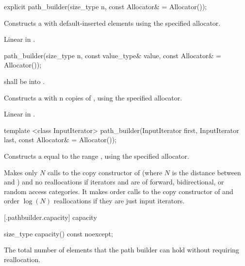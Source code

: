 %
\begin{itemdecl}
explicit path_builder(size_type n, const Allocator& = Allocator());
\end{itemdecl}
\begin{itemdescr}
\pnum
\effects
Constructs a  with  default-inserted elements using the specified allocator.

\pnum
\complexity
Linear in .
\end{itemdescr}

%
\begin{itemdecl}
path_builder(size_type n, const value_type& value,
  const Allocator& = Allocator());
\end{itemdecl}
\begin{itemdescr}
\pnum
\requires
{} shall be  into .

\pnum
\effects
Constructs a  with n copies of , using the specified allocator.

\pnum
\complexity
Linear in .
\end{itemdescr}

%
\begin{itemdecl}
template <class InputIterator>
path_builder(InputIterator first, InputIterator last,
  const Allocator& = Allocator());
\end{itemdecl}
\begin{itemdescr}
\pnum
\effects
Constructs a  equal to the range , using the specified allocator.

\pnum
\complexity
Makes only $N$ calls to the copy constructor of  (where $N$
is the distance between
and
)
and no reallocations if iterators  and  are of forward, bidirectional, or random access categories.
It makes order
calls to the copy constructor of
and order
$\log(N)$
reallocations if they are just input iterators.

\end{itemdescr}

 [\iotwod.pathbuilder.capacity] { capacity}%

%
\begin{itemdecl}
size_type capacity() const noexcept;
\end{itemdecl}
\begin{itemdescr}
\pnum
\returns
The total number of elements that the path builder can hold without requiring reallocation.
\end{itemdescr}


